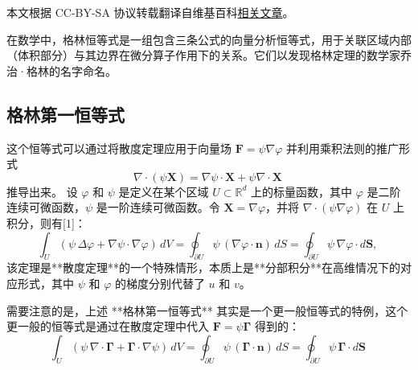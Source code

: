 
本文根据 CC-BY-SA 协议转载翻译自维基百科\href{https://en.wikipedia.org/wiki/Green\%27s_identities}{相关文章}。

在数学中，格林恒等式是一组包含三条公式的向量分析恒等式，用于关联区域内部（体积部分）与其边界在微分算子作用下的关系。它们以发现格林定理的数学家乔治·格林的名字命名。
\subsection{格林第一恒等式}
这个恒等式可以通过将散度定理应用于向量场 $\mathbf{F} = \psi \nabla \varphi$ 并利用乘积法则的推广形式
$$
\nabla \cdot (\psi \mathbf{X}) = \nabla \psi \cdot \mathbf{X} + \psi \nabla \cdot \mathbf{X}~
$$
推导出来。
设 $\varphi$ 和 $\psi$ 是定义在某个区域 $U \subset \mathbb{R}^d$ 上的标量函数，其中 $\varphi$ 是二阶连续可微函数，$\psi$ 是一阶连续可微函数。令 $\mathbf{X} = \nabla \varphi$，并将 $\nabla \cdot (\psi \nabla \varphi)$ 在 $U$ 上积分，则有[1]：
$$
\int_U \left(\psi \,\Delta \varphi + \nabla \psi \cdot \nabla \varphi \right) \, dV
= 
\oint_{\partial U} \psi \, (\nabla \varphi \cdot \mathbf{n}) \, dS
=
\oint_{\partial U} \psi \, \nabla \varphi \cdot d\mathbf{S},~
$$
该定理是**散度定理**的一个特殊情形，本质上是**分部积分**在高维情况下的对应形式，其中 $\psi$ 和 $\varphi$ 的梯度分别代替了 $u$ 和 $v$。

需要注意的是，上述 **格林第一恒等式** 其实是一个更一般恒等式的特例，这个更一般的恒等式是通过在散度定理中代入 $\mathbf{F} = \psi \mathbf{\Gamma}$ 得到的：
$$
\int_U \left(\psi \, \nabla \cdot \mathbf{\Gamma} + \mathbf{\Gamma} \cdot \nabla \psi \right)\, dV
=
\oint_{\partial U} \psi \, (\mathbf{\Gamma} \cdot \mathbf{n}) \, dS
=
\oint_{\partial U} \psi \, \mathbf{\Gamma} \cdot d\mathbf{S}~
$$
